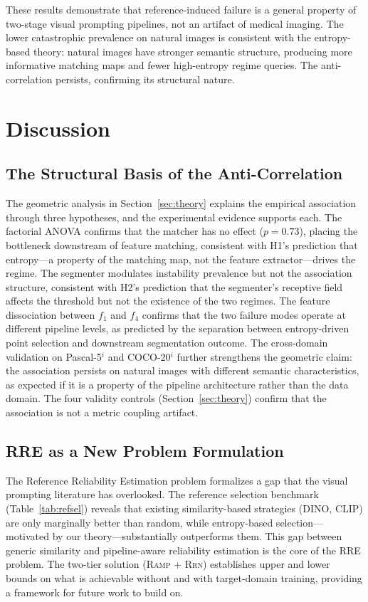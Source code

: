\documentclass[10pt,twocolumn,letterpaper]{article}
\newcommand{\RAMP}{\textsc{Ramp}}
\newcommand{\RRN}{\textsc{Rrn}}
\begin{document}
These results demonstrate that reference-induced failure is a general
property of two-stage visual prompting pipelines, not an artifact of medical
imaging. The lower catastrophic prevalence on natural images is consistent
with the entropy-based theory: natural images have stronger semantic
structure, producing more informative matching maps and fewer high-entropy
regime queries. The anti-correlation persists, confirming its structural
nature.

\section{Discussion}

\subsection{The Structural Basis of the Anti-Correlation}

The geometric analysis in Section~\ref{sec:theory} explains the
empirical association through three hypotheses, and the
experimental evidence supports each. The factorial ANOVA
confirms that the matcher has no effect ($p=0.73$), placing the bottleneck
downstream of feature matching, consistent with H1's prediction that
entropy---a property of the matching map, not the feature extractor---drives
the regime. The segmenter modulates instability prevalence but not the
association structure, consistent with H2's prediction that the
segmenter's receptive field affects the threshold but not
the existence of the two regimes. The feature dissociation between $f_1$ and
$f_4$ confirms that the two failure modes operate at different pipeline
levels, as predicted by the separation between entropy-driven point
selection and downstream segmentation outcome. The cross-domain validation
on Pascal-5$^i$ and COCO-20$^i$ further strengthens the geometric claim:
the association persists on natural images with different semantic
characteristics, as expected if it is a property of the pipeline
architecture rather than the data domain. The four validity controls
(Section~\ref{sec:theory}) confirm that the association is not a metric
coupling artifact.

\subsection{RRE as a New Problem Formulation}

The Reference Reliability Estimation problem formalizes a gap that the
visual prompting literature has overlooked. The reference selection
benchmark (Table~\ref{tab:refsel}) reveals that existing similarity-based
strategies (DINO, CLIP) are only marginally better than random, while
entropy-based selection---motivated by our theory---substantially
outperforms them. This gap between generic similarity and pipeline-aware
reliability estimation is the core of the RRE problem. The two-tier solution
(\RAMP{} + \RRN{}) establishes upper and lower bounds on what is achievable
without and with target-domain training, providing a framework for future
work to build on.
\end{document}

